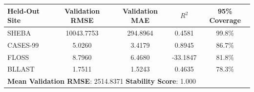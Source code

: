 \begin{tabular}{lcccc}
\toprule
Held-Out Site & Validation RMSE & Validation MAE & $R^2$ & 95\% Coverage \\
\midrule
SHEBA & 10043.7753 & 294.8964 & 0.4581 & 99.8\% \\
CASES-99 & 5.0260 & 3.4179 & 0.8945 & 86.7\% \\
FLOSS & 8.7960 & 6.4680 & -33.1847 & 81.8\% \\
BLLAST & 1.7511 & 1.5243 & 0.4635 & 78.3\% \\
\midrule
\multicolumn{5}{l}{\textbf{Mean Validation RMSE}: 2514.8371 \quad \textbf{Stability Score}: 1.000} \\
\bottomrule
\end{tabular}
